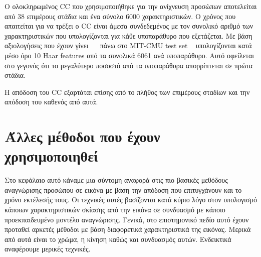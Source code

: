 Ο ολοκληρωμένος CC που χρησιμοποιήθηκε για την ανίχνευση προσώπων αποτελείται
από 38 επιμέρους στάδια και ένα σύνολο 6000 χαρακτηριστικών. Ο χρόνος που
απαιτείται για να τρέξει ο CC είναι άμεσα συνδεδεμένος με τον συνολικό αριθμό των
χαρακτηριστικών που υπολογίζονται για κάθε υποπαράθυρο που εξετάζεται.
Με βάση αξιολογήσεις που έχουν γίνει ~\cite{Viola01rapidobject}~\cite{Viola2004}
πάνω στο MIT-CMU test set ~\cite{Rowley:1998:NNF:275341.275344} υπολογίζονται κατά
μέσο όρο 10 Haar features από τα συνολικά 6061 ανά υποπαράθυρο. Αυτό οφείλεται
στο γεγονός ότι το μεγαλύτερο ποσοστό από τα υποπαράθυρα απορρίπτεται σε πρώτα
στάδια.

Η απόδοση του CC εξαρτάται επίσης από το πλήθος των επιμέρους σταδίων και την
απόδοση του καθενός από αυτά.


\section{Άλλες μέθοδοι που έχουν χρησιμοποιηθεί}\label{sec:othermethods}

Στο κεφάλαιο αυτό κάναμε μια σύντομη αναφορά στις πιο βασικές μεθόδους αναγνώρισης
προσώπου σε εικόνα με βάση την απόδοση που επιτυγχάνουν και το χρόνο εκτέλεσής τους.
Οι τεχνικές αυτές βασίζονται κατά κύριο λόγο στον υπολογισμό κάποιων χαρακτηριστικών
σκίασης από την εικόνα σε συνδυασμό με κάποιο προεκπαιδευμένο μοντέλο αναγνώρισης.
Γενικά, στο επιστημονικό πεδίο αυτό έχουν προταθεί αρκετές μέθοδοι με βάση διαφορετικά
χαρακτηριστικά της εικόνας. Μερικά από αυτά είναι το χρώμα, η κίνηση καθώς και
συνδυασμός αυτών. Ενδεικτικά αναφέρουμε μερικές τεχνικές.

